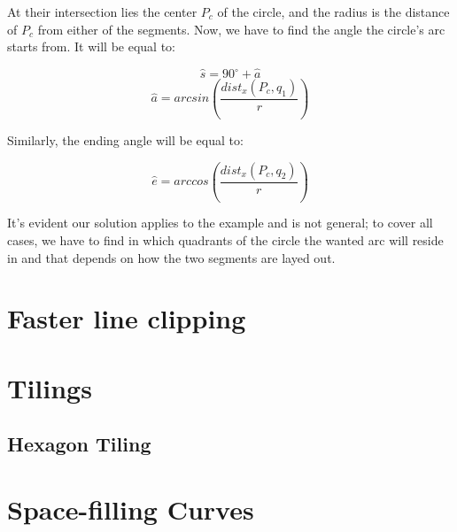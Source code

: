 \documentclass[12pt,openany,a4,usenames,dvipsnames]{book}
\begin{document}
\noindent{}At their intersection lies the center $P_c$ of the circle, and the radius is the distance of $P_c$ from either of the segments. Now, we have to find the angle the circle's arc starts from. It will be equal to:

$$\hat{s} = 90^{\circ} + \hat{a}$$
$$\hat{a} = arcsin(\frac{dist_x(P_c, q_1)}{r})$$

\noindent{}Similarly, the ending angle \textbf{\textcolor{white}{\cm{}\LARGE{}}} will be equal to:

$$\hat{e} = arccos(\frac{dist_x(P_c, q_2)}{r})$$

\noindent{}It's evident our solution applies to the example and is not general; to cover all cases, we have to find in which quadrants of the circle the wanted arc will reside in and that depends on how the two segments are layed out.

\chapter{Faster line clipping}
\skelpar%
\chapter{Tilings}
\section{Hexagon Tiling}
\chapter{Space-filling Curves}
\skelpar%
\clearpage{}
\end{document}
